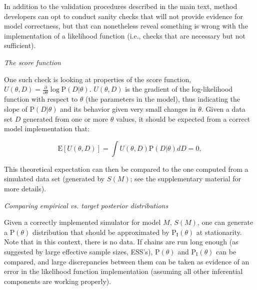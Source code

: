 \documentclass[oneside]{article}
\begin{document}
\vspace{.25cm}
\begin{tcolorbox}[breakable, width=\textwidth, colback=gray!10, boxrule=0pt,
  title=Box 2: Additional validation sanity-checks, fonttitle=\bfseries]
  \small

  In addition to the validation procedures described in the main text,
  method developers can opt to conduct sanity checks that will not
  provide evidence for model correctness, but that can nonetheless
  reveal something is wrong with the implementation of a likelihood
  function (i.e., checks that are necessary but not sufficient).
  
  \vspace{.25cm}
  \emph{The score function}
  
  One such check is looking at properties of the score function,
  $U(\theta,D)=\frac{\partial}{\partial\theta}\log
  \text{P}(D|\theta)$.
  $U(\theta,D)$ is the gradient of the log-likelihood function with
  respect to $\theta$ (the parameters in the model), thus indicating
  the slope of $\text{P}(D|\theta)$ and its behavior given very small
  changes in $\theta$.
  Given a data set $D$ generated from one or more $\theta$ values, it
  should be expected from a correct model implementation that:

  \begin{equation}\label{eq:scorefunction}
    \text{E}[U(\theta,D)] = \int U(\theta,D)\text{P}(D|\theta)dD = 0,
  \end{equation}


  This theoretical expectation can then be compared to the one
  computed from a simulated data set (generated by $S(M)$; see the
  supplementary material for more details).

  \vspace{.25cm}
  \emph{Comparing empirical vs. target posterior distributions}

  Given a correctly implemented simulator for model $M$, $S(M)$, one
  can generate a $\text{P}(\theta)$ distribution that should be approximated
  by $\text{P}_{\text{I}}(\theta)$ at stationarity.
  Note that in this context, there is no data.
  If chains are run long enough (as suggested by large effective
  sample sizes, ESS's), $\text{P}(\theta)$ and
  $\text{P}_{\text{I}}(\theta)$ can be compared, and large
  discrepancies between them can be taken as evidence of an error in the
  likelihood function implementation (assuming all other inferential
  components are working properly).


\end{tcolorbox}
\end{document}
